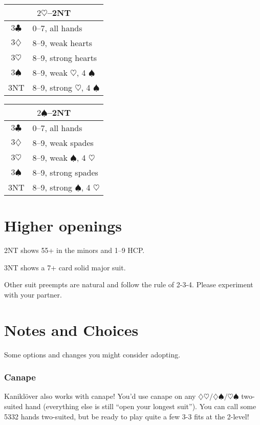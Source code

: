 \documentclass[a4paper, twoside, 11pt]{article}
\begin{document}
\begin{multicols}{3}
\begin{center}
\begin{tabular}{ |c|l| }
 \hline
 \multicolumn{2}{|c|}{$2\heartsuit$--\textnormal{2NT}} \\
 \hline
$3\clubsuit$ & 0--7, all hands\\
$3\diamondsuit$ & 8--9, weak hearts \\
$3\heartsuit$ & 8--9, strong hearts \\
$3\spadesuit$ & 8--9, weak $\heartsuit$, 4 $\spadesuit$ \\
 \textnormal{3NT} & 8--9, strong $\heartsuit$, 4 $\spadesuit$ \\
 \hline
\end{tabular}
\end{center}

\begin{center}
\begin{tabular}{ |c|l| }
 \hline
 \multicolumn{2}{|c|}{$2\spadesuit$--\textnormal{2NT}} \\
 \hline
$3\clubsuit$ & 0--7, all hands\\
$3\diamondsuit$ & 8--9, weak spades \\
$3\heartsuit$ & 8--9, weak $\spadesuit$, 4 $\heartsuit$ \\
$3\spadesuit$ & 8--9, strong spades \\
 \textnormal{3NT} & 8--9, strong $\spadesuit$, 4 $\heartsuit$ \\
 \hline
\end{tabular}
\end{center}


\section{Higher openings}

\textnormal{2NT} shows 55+ in the minors and 1--9 HCP.

\textnormal{3NT} shows a 7+ card solid major suit.

Other suit preempts are natural and follow the rule of 2-3-4. Please experiment with your partner.



\section{Notes and Choices}
Some options and changes you might consider adopting.

\itshape

\subsubsection*{Canape}
 Kaniklöver also works with canape! You'd use canape on any $\diamondsuit\heartsuit/ \diamondsuit\spadesuit/ \heartsuit\spadesuit$ two-suited hand (everything else is still ``open your longest suit''). You can call some 5332 hands two-suited, but be ready to play quite a few 3-3 fits at the 2-level!




\end{multicols}
\end{document}
